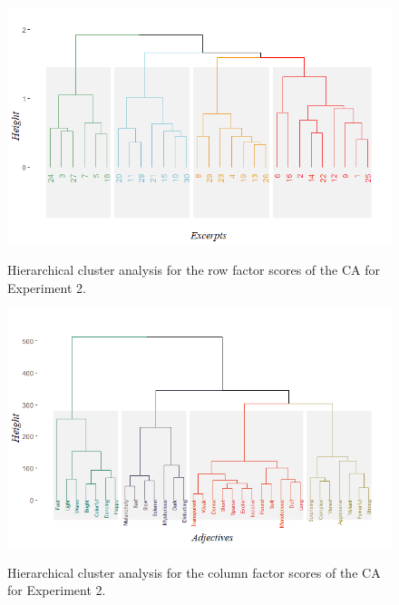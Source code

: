 \documentclass[
]{article}
\begin{document}
\begin{figure}[H]   
  \centering  
  \caption{Hierarchical cluster analysis for the row factor scores of the CA for Experiment 2.}
    \includegraphics{./supmatsimgs/ahca1.png}
  \label{fig:ahca1}
\end{figure}

\begin{figure}[H]   
  \centering  
  \caption{Hierarchical cluster analysis for the column factor scores of the CA for Experiment 2.}
    \includegraphics{./supmatsimgs/ahca2.png}
  \label{fig:ahca2}
\end{figure}
\end{document}
